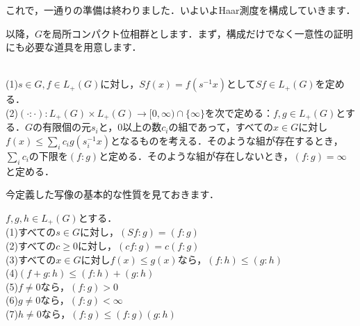 これで，一通りの準備は終わりました．いよいよHaar測度を構成していきます．

以降，$G$を局所コンパクト位相群とします．まず，構成だけでなく一意性の証明にも必要な道具を用意します．

\begin{ydefi}\label{17}
\leavevmode \\
(1)$s \in G, f \in L_{+}(G)$に対し，$Sf(x)=f(s^{-1}x)$として$Sf \in L_{+}(G)$を定める．\\
(2)$(\cdot \colon \cdot ) \colon L_{+}(G) \times L_{+}(G) \to [0, \infty) \cap \{ \infty \}$を次で定める：$f, g \in L_{+}(G)$とする．$G$の有限個の元$s_i$と，0以上の数$c_i$の組であって，すべての$x \in G$に対し$f(x) \le \sum_{i}c_{i} g(s_{i}^{-1}x)$となるものを考える．そのような組が存在するとき，$\sum_{i}c_i$の下限を$(f \colon g)$と定める．そのような組が存在しないとき，$(f \colon g)=\infty$と定める．
\end{ydefi}
今定義した写像の基本的な性質を見ておきます．
\begin{yprop}\label{18}
$f, g, h \in L_{+}(G)$とする．\\
(1)すべての$s \in G$に対し，$(Sf \colon g)=(f \colon g)$\\
(2)すべての$c \ge 0$に対し，$(cf \colon g)=c(f \colon g)$\\
(3)すべての$x \in G$に対し$f(x) \le g(x)$なら，$(f \colon h) \le (g \colon h)$\\
(4)$(f+g \colon h) \le (f \colon h)+(g \colon h)$\\
(5)$f \ne 0$なら，$( f \colon g ) > 0$\\
(6)$g \ne 0$なら，$( f \colon g ) < \infty $\\
(7)$h \ne 0$なら，$( f \colon g ) \le (f \colon g ) (g \colon h )$
\end{yprop}
